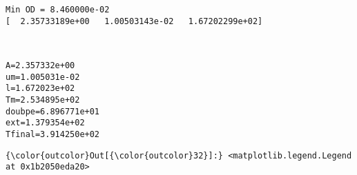 \documentclass[11pt]{article}
\begin{document}
    \begin{Verbatim}[commandchars=\\\{\}]
Min OD = 8.460000e-02
[  2.35733189e+00   1.00503143e-02   1.67202299e+02]

    \end{Verbatim}

    \begin{center}
    \end{center}
    { \hspace*{\fill} \\}
    
    \begin{Verbatim}[commandchars=\\\{\}]
A=2.357332e+00
um=1.005031e-02
l=1.672023e+02
Tm=2.534895e+02
doubpe=6.896771e+01
ext=1.379354e+02
Tfinal=3.914250e+02

    \end{Verbatim}

            \begin{Verbatim}[commandchars=\\\{\}]
{\color{outcolor}Out[{\color{outcolor}32}]:} <matplotlib.legend.Legend at 0x1b2050eda20>
\end{Verbatim}
        
    \begin{center}
    \end{center}
    { \hspace*{\fill} \\}
    
    \begin{center}
    \end{center}
    { \hspace*{\fill} \\}
    
\end{document}
